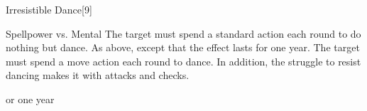 \begin{spellsection}{Irresistible Dance}[9]
    \begin{spellheader}
    \end{spellheader}
    \begin{spellcontent}
        \begin{spelltargetinginfo}
        \end{spelltargetinginfo}
        \begin{spelleffects}
            \begin{spellattack}{Spellpower vs. Mental}
                \spellsuccess The target must spend a standard action each round to do nothing but dance.
                \spellcritical As above, except that the effect lasts for one year.
                \spellfailure The target must spend a move action each round to dance.
                In addition, the struggle to resist dancing makes it \impaired with attacks and checks.
            \end{spellattack}
            \spelldur \durbrief or one year
        \end{spelleffects}
    \end{spellcontent}
    \begin{spellfooter}
        \miscastrandom
    \end{spellfooter}
\end{spellsection}


